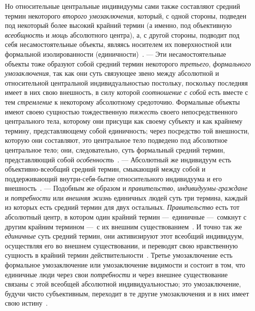 \documentclass[twoside]{article}
\begin{document}
{{{Но относительные центральные индивидуумы сами также составляют
средний термин некоторого {\em второго
умозаключения}, который, с одной стороны, подведен под
некоторый более высокий крайний термин (а именно, под объективную
{\em всеобщность} и
{\em мощь} абсолютного
центра), а, с другой стороны, подводит под себя несамостоятельные объекты,
являясь носителем их поверхностной или формальной изолированности
(единичности)~\label{bkm:bm75}.
— Эти несамостоятельные объекты тоже образуют
собой средний термин некоторого
{\em третьего},
{\em формального умозаключения},
так как они суть связующее звено между абсолютной и
относительной центральной индивидуальностью постольку, поскольку последняя
имеет в них свою внешность, в силу которой
{\em соотношение с собой}
есть вместе с тем
{\em стремление} к
некоторому абсолютному средоточию. Формальные объекты имеют своею сущностью
тождественную {\em тяжесть}
своего непосредственного центрального тела, которому они
присущи как своему субъекту и как крайнему термину, представляющему собой
единичность; через посредство той внешности, которую они составляют, это
центральное тело подведено под абсолютное центральное тело; они,
следовательно, суть формальный средний термин, представляющий собой
{\em особенность}~\label{bkm:bm76}.
— Абсолютный же индивидуум есть объективно-всеобщий средний
термин, смыкающий между собой и поддерживающий внутри-себя-бытие
относительного индивидуума и его
внешность~\label{bkm:bm77}.
— \label{bkm:bm52b}Подобным же образом и
{\em правительство},
{\em индивидуумы-граждане
}и {\em потребности}
или {\em внешняя жизнь}
единичных людей суть три термина, каждый из которых есть
средний термин для двух остальных.
{\em Правительство} есть
тот абсолютный центр, в котором один крайний термин
—~единичные —~сомкнут с другим крайним
термином —~с их внешним
существованием~\label{bkm:bm78}.
И точно так же
{\em единичные} суть
средний термин, они активизируют этот всеобщий индивидуум, осуществляя его
во внешнем существовании, и переводят свою нравственную сущность в крайний
термин
действительности~\label{bkm:bm79}.
Третье умозаключение есть формальное умозаключение или
умозаключение видимости и состоит в том, что единичные люди через свои
{\em потребности} и через
внешнее существование связаны с этой всеобщей абсолютной индивидуальностью;
это умозаключение, будучи чисто субъективным, переходит в те другие
умозаключения и в них имеет свою
истину\label{bkm:bm52c}~\label{bkm:bm80}.

}}}
\end{document}
